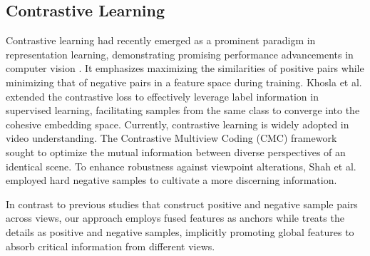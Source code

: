 \subsection{Contrastive Learning}
Contrastive learning had recently emerged as a prominent paradigm in representation learning, demonstrating promising performance advancements in computer vision \cite{Zhu2022BalancedCL}.
It emphasizes maximizing the similarities of positive pairs while minimizing that of negative pairs in a feature space during training.
Khosla et al. \cite{khosla2020supervised} extended the contrastive loss to effectively leverage label information in supervised learning, facilitating samples from the same class to converge into the cohesive embedding space.
Currently, contrastive learning is widely adopted in video understanding.
The Contrastive Multiview Coding (CMC) framework \cite{tian2020contrastive} sought to optimize the mutual information between diverse perspectives of an identical scene.
To enhance robustness against viewpoint alterations, Shah et al. \cite{shah2023multi}  employed hard negative samples to cultivate a more discerning information.%

In contrast to previous studies \cite{shah2023multi,siddiqui2024dvanet} that construct positive and negative sample pairs across views, our approach employs fused features as anchors while treats the details as positive and negative samples, implicitly promoting global features to absorb critical information from different views.


